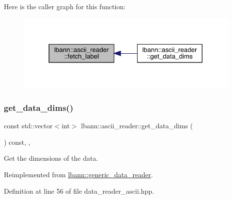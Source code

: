 Here is the caller graph for this function\+:\nopagebreak
\begin{figure}[H]
\begin{center}
\leavevmode
\includegraphics[width=317pt]{classlbann_1_1ascii__reader_a361f883c71236c37dd2bc2dda5f00ef3_icgraph}
\end{center}
\end{figure}
\mbox{\label{classlbann_1_1ascii__reader_afcd9c809960f236996e7838a995c0edd}} 
\subsubsection{\texorpdfstring{get\+\_\+data\+\_\+dims()}{get\_data\_dims()}}
{\footnotesize\ttfamily const std\+::vector$<$int$>$ lbann\+::ascii\+\_\+reader\+::get\+\_\+data\+\_\+dims (\begin{DoxyParamCaption}{ }\end{DoxyParamCaption}) const\hspace{0.3cm}{\ttfamily [inline]}, {\ttfamily [override]}, {\ttfamily [virtual]}}



Get the dimensions of the data. 



Reimplemented from \hyperlink{classlbann_1_1generic__data__reader_ae06ff27459ac4a5d8ac14655d4b31318}{lbann\+::generic\+\_\+data\+\_\+reader}.



Definition at line 56 of file data\+\_\+reader\+\_\+ascii.\+hpp.


